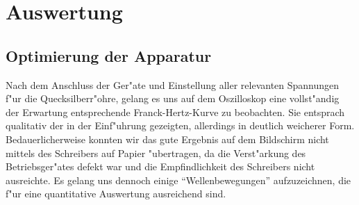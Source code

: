 \documentclass[a4paper,10pt]{article}
\begin{document}
\clearpage


\section{Auswertung}

\subsection{Optimierung der Apparatur}
Nach dem Anschluss der Ger"ate und Einstellung aller relevanten Spannungen f"ur die Quecksilberr"ohre, gelang es uns auf dem Oszilloskop eine vollst"andig der Erwartung entsprechende Franck-Hertz-Kurve zu beobachten. Sie entsprach qualitativ der in der Einf"uhrung gezeigten, allerdings in deutlich weicherer Form. Bedauerlicherweise konnten wir das gute Ergebnis auf dem Bildschirm nicht mittels des Schreibers auf Papier "ubertragen, da die Verst"arkung des Betriebsger"ates defekt war und die Empfindlichkeit des Schreibers nicht ausreichte. Es gelang uns dennoch einige "`Wellenbewegungen"' aufzuzeichnen, die f"ur eine quantitative Auswertung ausreichend sind.
\end{document}
